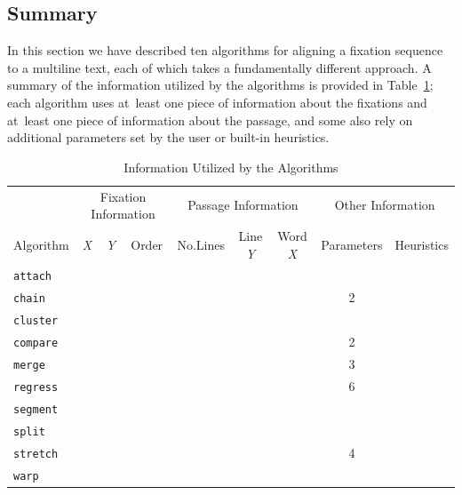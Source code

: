 \documentclass[doc,biblatex]{apa7}
\begin{document}
\subsection{Summary}

In this section we have described ten algorithms for aligning a fixation sequence to a multiline text, each of which takes a fundamentally different approach. A summary of the information utilized by the algorithms is provided in Table~\ref{table1}; each algorithm uses at~least one piece of information about the fixations and at~least one piece of information about the passage, and some also rely on additional parameters set by the user or built-in heuristics.

	\begin{table}
	\begin{center}
	\begin{threeparttable}
	\caption{Information Utilized by the Algorithms}
	\begin{tabular}{lcccccccc}
	\hline
	& \multicolumn{3}{c}{Fixation Information} & \multicolumn{3}{c}{Passage Information} & \multicolumn{2}{c}{Other Information} \\
	Algorithm & \textit{X} & \textit{Y} & Order & No.\@ Lines & Line \textit{Y} & Word \textit{X} & Parameters & Heuristics \\ \hline
	\texttt{attach}  & & \checkmark & & & \checkmark & & & \\
	\texttt{chain}   & \checkmark & \checkmark & \checkmark & & \checkmark & & 2 & \\
	\texttt{cluster} & & \checkmark & & \checkmark & & & & \\
	\texttt{compare} & \checkmark & \checkmark & \checkmark & & \checkmark & \checkmark & 2 & \\
	\texttt{merge}   & \checkmark & \checkmark & \checkmark & \checkmark & & & 3 & \checkmark \\
	\texttt{regress} & \checkmark & \checkmark & & \checkmark & \checkmark & & 6 & \\
	\texttt{segment} & \checkmark & & \checkmark & \checkmark & & & & \\
	\texttt{split}   & \checkmark & \checkmark & \checkmark & & \checkmark & & & \\
	\texttt{stretch} & & \checkmark & & & \checkmark & & 4 & \\
	\texttt{warp}    & \checkmark & \checkmark & \checkmark & & \checkmark & \checkmark & & \\ \hline
	\end{tabular}
	\label{table1}
	\end{threeparttable}
	\end{center}
	\end{table}
\end{document}
